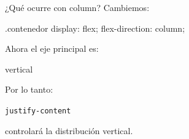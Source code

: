 \documentclass[aspectratio=169,11.5pt]{beamer}
\begin{document}

    \begin{frame}[fragile]{¿Qué ocurre con column?}
        Cambiemos:

        \begin{csscodedark}
            .contenedor {
                display: flex;
                flex-direction: column;
            }
        \end{csscodedark}

        Ahora el eje principal es:

        \begin{center}
            \Large
            vertical
        \end{center}

        Por lo tanto:

        \begin{center}
            \texttt{justify-content}
        \end{center}

        controlará la distribución vertical.
    \end{frame}
\end{document}
